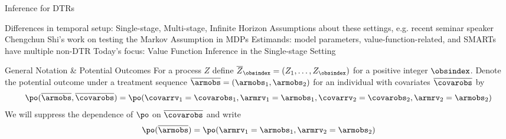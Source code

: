 %
\begin{frame}[label={overview:time}]{Inference for DTRs}

	Differences in temporal setup: Single-stage, Multi-stage, Infinite Horizon
	\vfill
	Assumptions about these settings, e.g. recent seminar speaker Chengchun
	Shi's work on testing the Markov Assumption in MDPs
	\vfill
	Estimands: model parameters, value-function-related, and SMARTs have
	multiple non-DTR
	\vfill \pause
	Today's focus: Value Function Inference in the Single-stage Setting
\end{frame}




\begin{frame}{General Notation \& Potential Outcomes}
	\vfill
	For a process $Z$ define $\overline{Z}_{\obsindex} = (Z_1, \ldots, Z_{\obsindex})$
	for a positive integer $\obsindex$.
	\pause \vfill
	Denote the potential outcome under a treatment sequence $\overline{\armobs} =
		(\armobs_1, \armobs_2)$ for an individual with covariates $\overline{\covarobs}$  by
	$$\po(\overline{\armobs}, \overline{\covarobs}) = \po(\covarrv_1 = \covarobs_1, \armrv_1 = \armobs_1, \covarrv_2 = \covarobs_2,\armrv_{2} = \armobs_{2})$$
	\pause \vfill
	We will suppress the dependence of $\po$ on $\overline{\covarobs}$ and write
	$$\po(\overline{\armobs}) = \po(\armrv_1 = \armobs_1, \armrv_{2} = \armobs_{2})$$
\end{frame}



